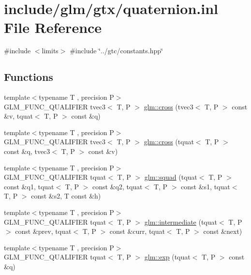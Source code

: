 \hypertarget{gtx_2quaternion_8inl}{}\section{include/glm/gtx/quaternion.inl File Reference}
\label{gtx_2quaternion_8inl}
{\ttfamily \#include $<$limits$>$}\newline
{\ttfamily \#include \char`\"{}../gtc/constants.\+hpp\char`\"{}}\newline
\subsection*{Functions}
\begin{DoxyCompactItemize}
\item 
{\footnotesize template$<$typename T , precision P$>$ }\\G\+L\+M\+\_\+\+F\+U\+N\+C\+\_\+\+Q\+U\+A\+L\+I\+F\+I\+ER tvec3$<$ T, P $>$ \hyperlink{group__gtx__quaternion_ga4bfe3c7770fc43d14b8ef0058c4a86b5}{glm\+::cross} (tvec3$<$ T, P $>$ const \&v, tquat$<$ T, P $>$ const \&q)
\item 
{\footnotesize template$<$typename T , precision P$>$ }\\G\+L\+M\+\_\+\+F\+U\+N\+C\+\_\+\+Q\+U\+A\+L\+I\+F\+I\+ER tvec3$<$ T, P $>$ \hyperlink{group__gtx__quaternion_ga33ecf8ba903eee5fc09f0fbfc0d5ca6b}{glm\+::cross} (tquat$<$ T, P $>$ const \&q, tvec3$<$ T, P $>$ const \&v)
\item 
{\footnotesize template$<$typename T , precision P$>$ }\\G\+L\+M\+\_\+\+F\+U\+N\+C\+\_\+\+Q\+U\+A\+L\+I\+F\+I\+ER tquat$<$ T, P $>$ \hyperlink{group__gtx__quaternion_gae75f537becdf2b1381b4482ec96e6c82}{glm\+::squad} (tquat$<$ T, P $>$ const \&q1, tquat$<$ T, P $>$ const \&q2, tquat$<$ T, P $>$ const \&s1, tquat$<$ T, P $>$ const \&s2, T const \&h)
\item 
{\footnotesize template$<$typename T , precision P$>$ }\\G\+L\+M\+\_\+\+F\+U\+N\+C\+\_\+\+Q\+U\+A\+L\+I\+F\+I\+ER tquat$<$ T, P $>$ \hyperlink{group__gtx__quaternion_ga56abae85b3669c866e91f3c57b298b9c}{glm\+::intermediate} (tquat$<$ T, P $>$ const \&prev, tquat$<$ T, P $>$ const \&curr, tquat$<$ T, P $>$ const \&next)
\item 
{\footnotesize template$<$typename T , precision P$>$ }\\G\+L\+M\+\_\+\+F\+U\+N\+C\+\_\+\+Q\+U\+A\+L\+I\+F\+I\+ER tquat$<$ T, P $>$ \hyperlink{group__gtx__quaternion_ga17295173d4c2b5ae49b84e9993b63a62}{glm\+::exp} (tquat$<$ T, P $>$ const \&q)

\end{DoxyCompactItemize}
